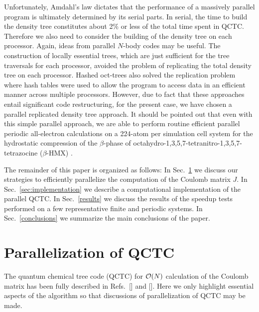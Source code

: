 \commentoutA{\documentclass[prl,aps,twocolumn,twocolumngrid,superbib]{revtex4}}
\begin{document}
Unfortunately, Amdahl's law dictates that the performance of a
massively parallel program is ultimately determined by its serial
parts.  In serial, the time to build the density tree constitutes
about 2\% or less of the total time spent in QCTC.  Therefore we also
need to consider the building of the density tree on each processor.
Again, ideas from parallel $N$-body codes may be useful.  The
construction of locally essential trees, which are just sufficient for
the tree traversals for each processor,\cite{MWarren92} avoided the
problem of replicating the total density tree on each processor.
Hashed oct-trees\cite{MWarren93,MWarren95b} also solved the
replication problem where hash tables were used to allow the program
to access data in an efficient manner across multiple
processors. However, due to fact that these approaches entail
significant code restructuring, for the present case, we have chosen a
parallel replicated density tree approach. It should be pointed out
that even with this simple parallel approach, we are able to perform
routine efficient parallel periodic all-electron calculations on a
224-atom per simulation cell system for the hydrostatic compression of
the $\beta$-phase of octahydro-1,3,5,7-tetranitro-1,3,5,7-tetrazocine
($\beta$-HMX)
\cite{CGan04C}.

The remainder of this paper is organized as follows: In
Sec.~\ref{ParaQCTC} we discuss our strategies to efficiently
parallelize the computation of the Coulomb matrix $J$. In
Sec.~\ref{sec:implementation} we describe a computational
implementation of the parallel QCTC. In Sec.~\ref{results} we discuss
the results of the speedup tests performed on a few representative
finite and periodic systems. In Sec.~\ref{conclusions} we summarize
the main conclusions of the paper.

\section{Parallelization of QCTC}
\label{ParaQCTC}
The quantum chemical tree code (QCTC) for ${\cal O}(N)$ calculation of
the Coulomb matrix has been fully described in
Refs.~[] and [].
Here we only highlight essential aspects of the algorithm so that
discussions of parallelization of QCTC may be made.
\end{document}
